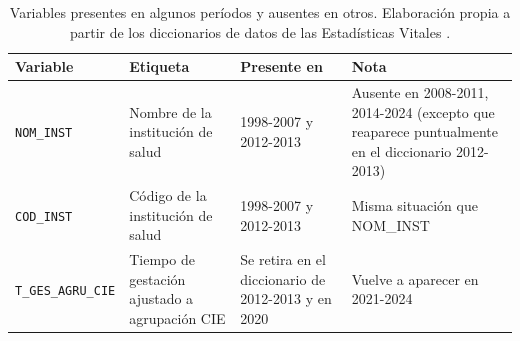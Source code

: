 \begin{table}[!htbp]
\centering
\caption[Variables presentes en unos períodos y ausentes en otros]{Variables presentes en algunos períodos y ausentes en otros. Elaboración propia a partir de los diccionarios de datos de las Estadísticas Vitales \citep{dane2024}.}
\label{tab:vars-eliminadas}
\footnotesize
\begin{tabularx}{\textwidth}{@{}p{3.4cm}p{4.2cm}p{3.4cm}X@{}}
\toprule
\textbf{Variable} & \textbf{Etiqueta} & \textbf{Presente en} & \textbf{Nota} \\
\midrule
\texttt{NOM\_INST} & Nombre de la institución de salud & 1998-2007 y 2012-2013 & Ausente en 2008-2011, 2014-2024 (excepto que reaparece puntualmente en el diccionario 2012-2013) \\
\texttt{COD\_INST} & Código de la institución de salud & 1998-2007 y 2012-2013 & Misma situación que NOM\_INST \\
\texttt{T\_GES\_AGRU\_CIE} & Tiempo de gestación ajustado a agrupación CIE & Se retira en el diccionario de 2012-2013 y en 2020 & Vuelve a aparecer en 2021-2024 \\
\bottomrule
\end{tabularx}
\end{table}
